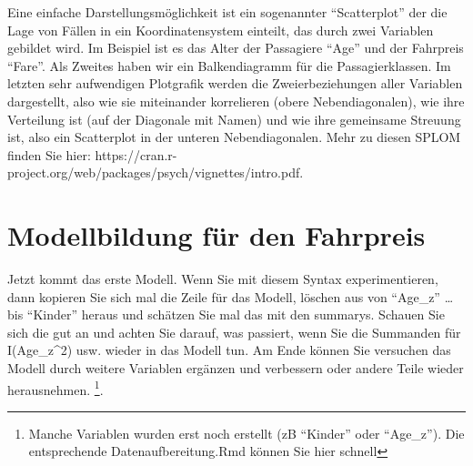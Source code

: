 \documentclass[
  10pt,
  letterpaper,
  a4paper, twoside]{scrreprt}
\begin{document}
Eine einfache Darstellungsmöglichkeit ist ein sogenannter
\enquote{Scatterplot} der die Lage von Fällen in ein Koordinatensystem
einteilt, das durch zwei Variablen gebildet wird. Im Beispiel ist es das
Alter der Passagiere \enquote{Age} und der Fahrpreis \enquote{Fare}. Als
Zweites haben wir ein Balkendiagramm für die Passagierklassen. Im
letzten sehr aufwendigen Plotgrafik werden die Zweierbeziehungen aller
Variablen dargestellt, also wie sie miteinander korrelieren (obere
Nebendiagonalen), wie ihre Verteilung ist (auf der Diagonale mit Namen)
und wie ihre gemeinsame Streuung ist, also ein Scatterplot in der
unteren Nebendiagonalen. Mehr zu diesen SPLOM finden Sie hier:
https://cran.r-project.org/web/packages/psych/vignettes/intro.pdf.

\begin{figure}


\caption{\label{fig-titanic-Datenvisualisierungen-1}}

\end{figure}%

\begin{figure}


\caption{\label{fig-titanic-Datenvisualisierungen-2}}

\end{figure}%

\section{Modellbildung für den
Fahrpreis}\label{modellbildung-fuxfcr-den-fahrpreis}

Jetzt kommt das erste Modell. Wenn Sie mit diesem Syntax
experimentieren, dann kopieren Sie sich mal die Zeile für das Modell,
löschen aus von \enquote{Age\_z} \ldots{} bis \enquote{Kinder} heraus
und schätzen Sie mal das mit den summarys. Schauen Sie sich die gut an
und achten Sie darauf, was passiert, wenn Sie die Summanden für
I(Age\_z\^{}2) usw. wieder in das Modell tun. Am Ende können Sie
versuchen das Modell durch weitere Variablen ergänzen und verbessern
oder andere Teile wieder herausnehmen. \footnote{Manche Variablen wurden
  erst noch erstellt (zB \enquote{Kinder} oder \enquote{Age\_z}). Die
  entsprechende Datenaufbereitung.Rmd können Sie hier schnell}.
\end{document}

